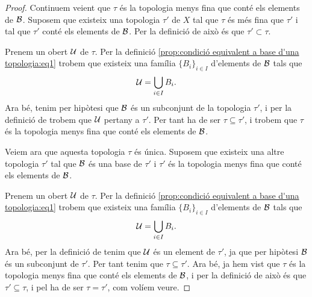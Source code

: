 \documentclass[../Apunts.tex]{subfiles}
\begin{document}
\begin{proposition}
\begin{proof}
			Continuem veient que \(\tau\) és la topologia menys fina que conté els elements de \(\mathcal{B}\). Suposem que existeix una topologia \(\tau'\) de \(X\) tal que \(\tau\) és més fina que \(\tau'\) i tal que \(\tau'\) conté els elements de \(\mathcal{B}\). Per la definició de  això és que \(\tau'\subset\tau\).
			
			Prenem un obert \(\mathcal{U}\) de \(\tau\). Per la definició \eqref{prop:condició equivalent a base d'una topologia:eq1} trobem que existeix una família \(\{B_{i}\}_{i\in I}\) d'elements de \(\mathcal{B}\) tals que
			\[\mathcal{U}=\bigcup_{i\in I}B_{i}.\]
			Ara bé, tenim per hipòtesi que \(\mathcal{B}\) és un subconjunt de la topologia \(\tau'\), i per la definició de  trobem que \(\mathcal{U}\) pertany a \(\tau'\). Per tant ha de ser \(\tau\subseteq\tau'\), i trobem que \(\tau\) és la topologia menys fina que conté els elements de \(\mathcal{B}\).
			
			Veiem ara que aquesta topologia \(\tau\) és única. Suposem que existeix una altre topologia \(\tau'\) tal que \(\mathcal{B}\) és una base de \(\tau'\) i \(\tau'\) és la topologia menys fina que conté els elements de \(\mathcal{B}\).
			
			Prenem un obert \(\mathcal{U}\) de \(\tau\). Per la definició \eqref{prop:condició equivalent a base d'una topologia:eq1} trobem que existeix una família \(\{B_{i}\}_{i\in I}\) d'elements de \(\mathcal{B}\) tals que
			\[\mathcal{U}=\bigcup_{i\in I}B_{i}.\]
			Ara bé, per la definició de  tenim que \(\mathcal{U}\) és un element de \(\tau'\), ja que per hipòtesi \(\mathcal{B}\) és un subconjunt de \(\tau'\). Per tant tenim que \(\tau\subseteq\tau'\). Ara bé, ja hem vist que \(\tau\) és la topologia menys fina que conté els elements de \(\mathcal{B}\), i per la definició de  això és que \(\tau'\subseteq\tau\), i pel  ha de ser \(\tau=\tau'\), com volíem veure.
		\end{proof}
	\end{proposition}
\end{document}
